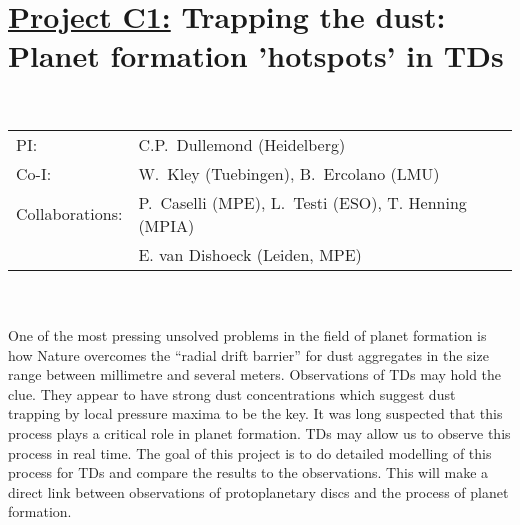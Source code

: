 \pagebreak[4]

\section*{\underline{Project C1:} 
Trapping the dust: Planet formation 'hotspots' in TDs}

\\
\begin{tabular}{ll}
{\textsf{PI:}}                  & C.P.~Dullemond (Heidelberg)\\
{\textsf{Co-I:}}                & W.~Kley (Tuebingen), B.~Ercolano (LMU) \\
{\textsf{Collaborations:}}      & P.~Caselli (MPE), L.~Testi (ESO), T. Henning (MPIA) \\
& E. van Dishoeck (Leiden, MPE) \\
\end{tabular}

\vspace{0.5em}
 \\

\vspace{0.5em}
\\
One of the most pressing unsolved problems in the field of planet formation
is how Nature overcomes the ``radial drift barrier'' for dust aggregates in
the size range between millimetre and several meters. Observations of
TDs may hold the clue. They appear to have strong dust
concentrations which suggest dust trapping by local pressure maxima to be
the key. It was long suspected that this process plays a critical role in
planet formation.  TDs may allow us to observe this process in
real time. The goal of this project is to do detailed modelling of this
process for TDs and compare the results to the
observations. This will make a direct link between observations of
protoplanetary discs and the process of planet formation.

